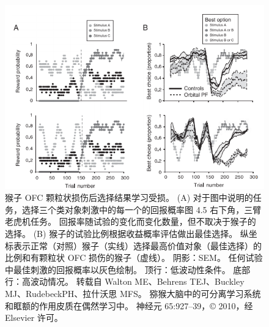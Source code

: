 \begin{figure}[!htb]
	\centering
	\includegraphics{image_pfc/Fig_4_6}
	\caption{猴子 OFC 颗粒状损伤后选择结果学习受损。 (A) 对于图中说明的任务，选择三个类对象刺激中的每一个的回报概率图 4.5 右下角，三臂老虎机任务。 回报率随试验的变化而变化数量，但不取决于猴子的选择。 (B) 猴子的试验比例根据收益概率评估做出最佳选择。 纵坐标表示正常（对照）猴子（实线）选择最高价值对象（最佳选择）的比例和有颗粒状 OFC 损伤的猴子（虚线）。 阴影：SEM。 任何试验中最佳刺激的回报概率以灰色绘制。 顶行：低波动性条件。 底部行：高波动情况。 转载自 Walton ME、Behrens TEJ、Buckley MJ、RudebeckPH、拉什沃思 MFS。 猕猴大脑中的可分离学习系统和眶额的作用皮质在偶然学习中。 神经元 65:927–39，© 2010，经 Elsevier 许可。}
	\label{fig:fig_4_6}
\end{figure}


